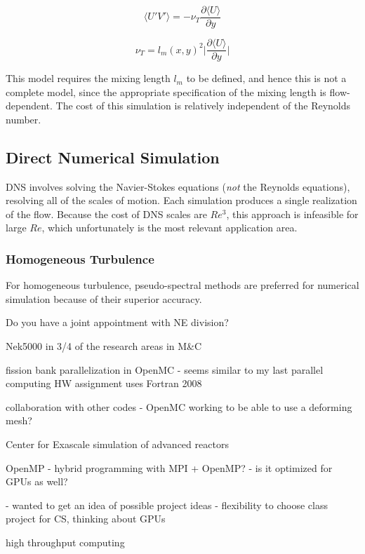 \documentclass[10pt]{article}
\newcommand{\beq}{\begin{equation}}
\newcommand{\eeq}{\end{equation}}
\newcommand{\la}{\langle}
\newcommand{\ra}{\rangle}
\begin{document}
\begin{flushleft}
\beq
\la U'V'\ra=-\nu_T\frac{\partial\la U\ra}{\partial y}
\eeq

\beq
\nu_T=l_m(x,y)^2\biggr\rvert\frac{\partial\la U\ra}{\partial y}\biggr\rvert
\eeq

This model requires the mixing length \(l_m\) to be defined, and hence this is not a complete model, since the appropriate specification of the mixing length is flow-dependent. The cost of this simulation is relatively independent of the Reynolds number. 




\subsection{Direct Numerical Simulation}
DNS involves solving the Navier-Stokes equations (\textit{not} the Reynolds equations), resolving all of the scales of motion. Each simulation produces a single realization of the flow. Because the cost of DNS scales are \(Re^3\), this approach is infeasible for large \(Re\), which unfortunately is the most relevant application area. 

\subsubsection{Homogeneous Turbulence}
For homogeneous turbulence, pseudo-spectral methods are preferred for numerical simulation because of their superior accuracy. 











Do you have a joint appointment with NE division?

Nek5000 in 3/4 of the research areas in M\&C

fission bank parallelization in OpenMC - seems similar to my last parallel computing HW assignment
uses Fortran 2008

collaboration with other codes - OpenMC working to be able to use a deforming mesh?

Center for Exascale simulation of advanced reactors

OpenMP - hybrid programming with MPI + OpenMP?
			  - is it optimized for GPUs as well?

- wanted to get an idea of possible project ideas - flexibility to choose class project for CS, thinking about GPUs

high throughput computing


\end{flushleft}
\end{document}
